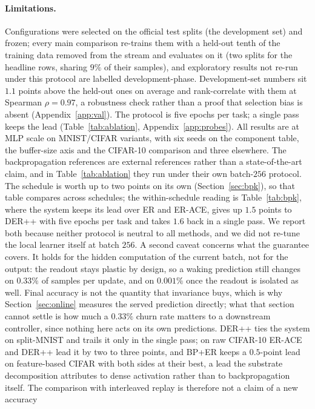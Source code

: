 \documentclass{article}
\begin{document}
\paragraph{Limitations.}
Configurations were selected on the official test splits (the development set) and frozen;
every main comparison re-trains them with a held-out tenth of the training data removed from
the stream and evaluates on it (two splits for the headline rows, sharing $9\%$ of their
samples), and exploratory results not re-run under this protocol are labelled
development-phase. Development-set numbers sit $1.1$ points above the held-out ones on
average and rank-correlate with them at Spearman $\rho=0.97$, a robustness check rather
than a proof that selection bias is absent (Appendix~\ref{app:val}). The protocol is five
epochs per task; a single pass keeps the lead (Table~\ref{tab:ablation},
Appendix~\ref{app:probes}). All results are at MLP scale on MNIST/CIFAR variants, with six
seeds on the component table, the buffer-size axis and the CIFAR-10 comparison and three
elsewhere. The backpropagation references are external references rather than a
state-of-the-art claim, and in Table~\ref{tab:ablation} they run under their own batch-$256$
protocol. The schedule is worth up to two points on its own
(Section~\ref{sec:bpk}), so that table compares across schedules; the within-schedule
reading is Table~\ref{tab:bpk}, where the system keeps its lead over ER and ER-ACE, gives up
$1.5$ points to DER++ with five epochs per task and takes $1.6$ back in a single pass. We
report both because neither protocol is neutral to all methods, and we did not re-tune the
local learner itself at batch $256$.
A second caveat concerns what the guarantee covers. It holds for the hidden computation of
the current batch, not for the output: the readout stays plastic by design, so a waking
prediction still changes on $0.33\%$ of samples per update, and on $0.001\%$ once the
readout is isolated as well. Final accuracy is not the quantity that invariance buys, which
is why Section~\ref{sec:online} measures the served prediction directly; what that section
cannot settle is how much a $0.33\%$ churn rate matters to a downstream controller, since
nothing here acts on its own predictions.
DER++ ties the system on split-MNIST and trails it only in the
single pass; on raw CIFAR-10 ER-ACE and DER++ lead it by two to three points, and BP+ER
keeps a $0.5$-point lead on feature-based CIFAR with both sides at their best, a lead the
substrate decomposition attributes to dense activation rather than to backpropagation
itself. The comparison with interleaved replay is therefore not a claim of a new accuracy
\end{document}
